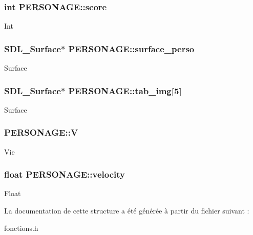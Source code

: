 \subsubsection[{\texorpdfstring{score}{score}}]{\setlength{\rightskip}{0pt plus 5cm}int P\+E\+R\+S\+O\+N\+A\+G\+E\+::score}\hypertarget{structPERSONAGE_aceab7ab293b56197a8dc153b1aaa2d9e}{}\label{structPERSONAGE_aceab7ab293b56197a8dc153b1aaa2d9e}
Int 
\subsubsection[{\texorpdfstring{surface\+\_\+perso}{surface_perso}}]{\setlength{\rightskip}{0pt plus 5cm}S\+D\+L\+\_\+\+Surface$\ast$ P\+E\+R\+S\+O\+N\+A\+G\+E\+::surface\+\_\+perso}\hypertarget{structPERSONAGE_a26a39d344c1ec5d424198c24538f73dc}{}\label{structPERSONAGE_a26a39d344c1ec5d424198c24538f73dc}
Surface 
\subsubsection[{\texorpdfstring{tab\+\_\+img}{tab_img}}]{\setlength{\rightskip}{0pt plus 5cm}S\+D\+L\+\_\+\+Surface$\ast$ P\+E\+R\+S\+O\+N\+A\+G\+E\+::tab\+\_\+img\mbox{[}5\mbox{]}}\hypertarget{structPERSONAGE_a51061ec01fedcce4c8562e043d81cd7a}{}\label{structPERSONAGE_a51061ec01fedcce4c8562e043d81cd7a}
Surface 
\subsubsection[{\texorpdfstring{V}{V}}]{ P\+E\+R\+S\+O\+N\+A\+G\+E\+::V}\hypertarget{structPERSONAGE_a55ff47547f25a0a9df67118b91ea58e1}{}\label{structPERSONAGE_a55ff47547f25a0a9df67118b91ea58e1}
Vie 
\subsubsection[{\texorpdfstring{velocity}{velocity}}]{\setlength{\rightskip}{0pt plus 5cm}float P\+E\+R\+S\+O\+N\+A\+G\+E\+::velocity}\hypertarget{structPERSONAGE_aaf4734e2f426e60eef271207bc0d3b3d}{}\label{structPERSONAGE_aaf4734e2f426e60eef271207bc0d3b3d}
Float 

La documentation de cette structure a été générée à partir du fichier suivant \+:\begin{DoxyCompactItemize}
\item 
fonctions.\+h\end{DoxyCompactItemize}
